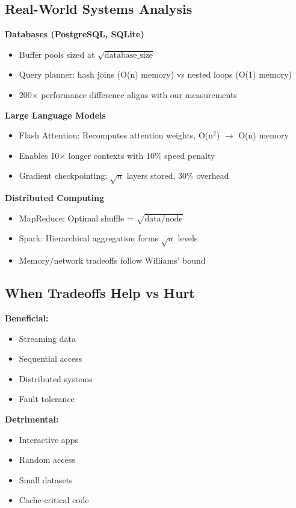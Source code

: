 \documentclass[11pt,twocolumn]{article}
\begin{document}
\subsection{Real-World Systems Analysis}

\textbf{Databases (PostgreSQL, SQLite)}
\begin{itemize}
\item Buffer pools sized at $\sqrt{\text{database\_size}}$
\item Query planner: hash joins (O(n) memory) vs nested loops (O(1) memory)  
\item 200$\times$ performance difference aligns with our measurements
\end{itemize}

\textbf{Large Language Models}
\begin{itemize}
\item Flash Attention: Recomputes attention weights, O(n$^2$) $\rightarrow$ O(n) memory
\item Enables 10$\times$ longer contexts with 10\% speed penalty
\item Gradient checkpointing: $\sqrt{n}$ layers stored, 30\% overhead
\end{itemize}

\textbf{Distributed Computing}
\begin{itemize}
\item MapReduce: Optimal shuffle = $\sqrt{\text{data/node}}$
\item Spark: Hierarchical aggregation forms $\sqrt{n}$ levels
\item Memory/network tradeoffs follow Williams' bound
\end{itemize}

\subsection{When Tradeoffs Help vs Hurt}

\begin{minipage}[t]{0.48\columnwidth}
\textbf{Beneficial:}
\begin{itemize}
\item Streaming data
\item Sequential access
\item Distributed systems
\item Fault tolerance
\end{itemize}
\end{minipage}
\hfill
\begin{minipage}[t]{0.48\columnwidth}
\textbf{Detrimental:}
\begin{itemize}
\item Interactive apps
\item Random access
\item Small datasets  
\item Cache-critical code
\end{itemize}
\end{minipage}
\end{document}
